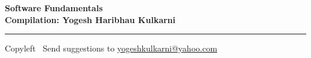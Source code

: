 
\graphicspath{{images/}}


\footnotesize


\begin{center}
\Large{\textbf{Software Fundamentals\\ Compilation: Yogesh Haribhau Kulkarni}}  
\end{center}

\begin{multicols}{2}

\end{multicols}

\rule{\linewidth}{0.25pt}
\scriptsize
Copyleft \textcopyleft\  Send suggestions to 
\href{http://www.yogeshkulkarni.com}{yogeshkulkarni@yahoo.com}


